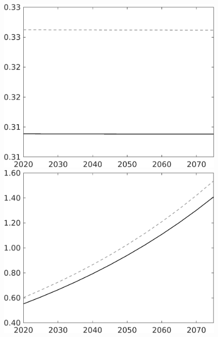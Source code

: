 \documentclass[12pt]{article}
\begin{document}
\begin{figure}[h!!]
\begin{minipage}[]{0.32\textwidth}
	\end{minipage}	
	\begin{minipage}[]{0.32\textwidth}
		\includegraphics[width=1\textwidth]{../../codding_model/own_basedOnFried/optimalPol_010922_revision/figures/all_13Sept22/CompTaul_Equlab_LFBAU_Reg0_hl_spillover0_nsk0_xgr0_knspil0_sep1_countec0_GovRev0_etaa0.79_lgd0.png}
	\end{minipage}	
	\begin{minipage}[]{0.32\textwidth}
		\includegraphics[width=1\textwidth]{../../codding_model/own_basedOnFried/optimalPol_010922_revision/figures/all_13Sept22/CompTaul_Equlab_LFBAU_Reg0_C_spillover0_nsk0_xgr0_knspil0_sep1_countec0_GovRev0_etaa0.79_lgd0.png}

\end{minipage}
\end{figure}
\end{document}
